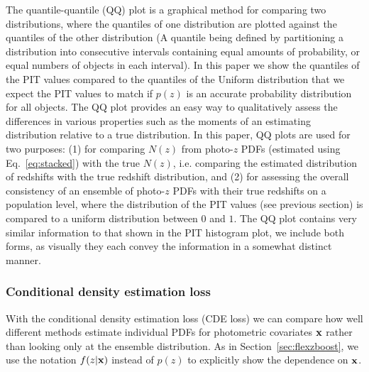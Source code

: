 The quantile-quantile (QQ) plot is a graphical method for comparing two distributions, where the quantiles of one distribution are plotted against the quantiles of the other distribution (A quantile being defined by partitioning a distribution into consecutive intervals containing equal amounts of probability, or equal numbers of objects in each interval).
In this paper we show the quantiles of the PIT values compared to the quantiles of the Uniform distribution that we expect the PIT values to match if $p(z)$ is an accurate probability distribution for all objects.
The QQ plot provides an easy way to qualitatively assess the differences in various properties such as the moments of an estimating distribution relative to a true distribution.
In this paper, QQ plots are used for two purposes: (1) for comparing $N(z)$ from photo-$z$ PDFs (estimated using Eq.~\ref{eq:stacked}) with the true $N(z)$, i.e. comparing the estimated distribution of redshifts with the true redshift distribution, and (2) for assessing the overall consistency of an ensemble of photo-$z$ PDFs with their true redshifts on a population level, where the distribution of the PIT values (see previous section) is compared to a uniform distribution between $0$ and $1$.  The QQ plot contains very similar information to that shown in the PIT histogram plot, we include both forms, as visually they each convey the information in a somewhat distinct manner. %

\subsubsection{Conditional density estimation loss}
\label{sec:CDE_loss}

With the conditional density estimation loss (CDE loss) we can compare how well different methods estimate individual PDFs for photometric covariates ${\mathbf{x}}$ rather than looking only at the ensemble distribution.  As in Section~\ref{sec:flexzboost}, we use the notation $f(z \vert {\mathbf{x}})$ instead of $p(z)$ to explicitly show the dependence on ${\mathbf{x}}$.

